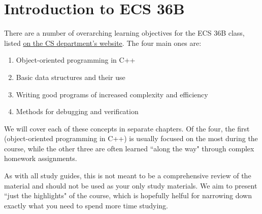 \chapter{Introduction to ECS 36B}
There are a number of overarching learning objectives for the ECS 36B class,
listed
\href{https://www.cs.ucdavis.edu/blog/ecs-36b-software-development-and-object-oriented-programming/}{on
the CS department's website}.  The four main ones are:

\begin{enumerate}
    \item Object-oriented programming in C++
    \item Basic data structures and their use
    \item Writing good programs of increased complexity and efficiency
    \item Methods for debugging and verification
\end{enumerate}

We will cover each of these concepts in separate chapters. Of the four, the
first (object-oriented programming in C++) is usually focused on the most
during the course, while the other three are often learned ``along the way"
through complex homework assignments.

As with all study guides, this is not meant to be a comprehensive review of the
material and should not be used as your only study materials. We aim to present
``just the highlights" of the course, which is hopefully helful for narrowing
down exactly what you need to spend more time studying.
